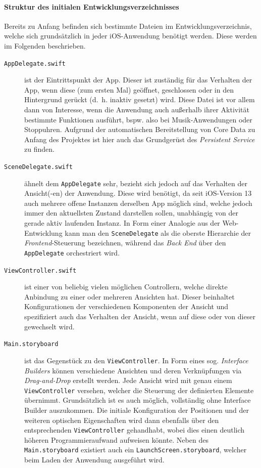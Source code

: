 \paragraph{Struktur des initialen Entwicklungsverzeichnisses}
Bereits zu Anfang befinden sich bestimmte Dateien im Entwicklungsverzeichnis, welche sich grundsätzlich in jeder iOS-Anwendung benötigt werden. Diese werden im Folgenden beschrieben.

\begin{description}
	\item[\texttt{AppDelegate.swift}] ist der Eintrittspunkt der App. Dieser ist zuständig für das Verhalten der App, wenn diese (zum ersten Mal) geöffnet, geschlossen oder in den Hintergrund gerückt (d.\ h. inaktiv gesetzt) wird. Diese Datei ist vor allem dann von Interesse, wenn die Anwendung auch außerhalb ihrer Aktivität bestimmte Funktionen ausführt, bspw. also bei Musik-Anwendungen oder Stoppuhren. Aufgrund der automatischen Bereitstellung von Core Data zu Anfang des Projektes ist hier auch das Grundgerüst des \textit{Persistent Service} zu finden.
	\item[\texttt{SceneDelegate.swift}] ähnelt dem \texttt{AppDelegate} sehr, bezieht sich jedoch auf das Verhalten der Ansicht(-en) der Anwendung. Diese wird benötigt, da seit iOS-Version 13 auch mehrere offene Instanzen derselben App möglich sind, welche jedoch immer den aktuellsten Zustand darstellen sollen, unabhängig von der gerade aktiv laufenden Instanz. In Form einer Analogie aus der Web-Entwicklung kann man den \texttt{SceneDelegate} als die oberste Hierarchie der \textit{Frontend}-Steuerung bezeichnen, während das \textit{Back End} über den \texttt{AppDelegate} orchestriert wird.
	\item[\texttt{ViewController.swift}] ist einer von beliebig vielen möglichen Controllern, welche direkte Anbindung zu einer oder mehreren Ansichten hat. Dieser beinhaltet Konfigurationen der verschiedenen Komponenten der Ansicht und spezifiziert auch das Verhalten der Ansicht, wenn auf diese oder von dieser gewechselt wird.
	\item[\texttt{Main.storyboard}] ist das Gegenstück zu den \texttt{ViewController}. In Form eines sog. \textit{Interface Builders} können verschiedene Ansichten und deren Verknüpfungen via \textit{Drag-and-Drop} erstellt werden. Jede Ansicht wird mit genau einem \texttt{ViewController} versehen, welcher die Steuerung der definierten Elemente übernimmt. Grundsätzlich ist es auch möglich, vollständig ohne Interface Builder auszukommen. Die initiale Konfiguration der Positionen und der weiteren optischen Eigenschaften wird dann ebenfalls über den entsprechenden \texttt{ViewController} gehandhabt, wobei dies einen deutlich höheren Programmieraufwand aufweisen könnte. Neben des \texttt{Main.storyboard} existiert auch ein \texttt{LaunchScreen.storyboard}, welcher beim Laden der Anwendung ausgeführt wird.

\end{description}
